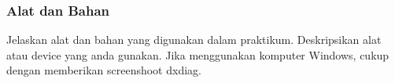 \par
\subsubsection{Alat dan Bahan}

Jelaskan alat dan bahan yang digunakan dalam praktikum. Deskripsikan alat atau
device yang anda gunakan. Jika menggunakan komputer Windows, cukup dengan
memberikan screenshoot dxdiag.
\par
